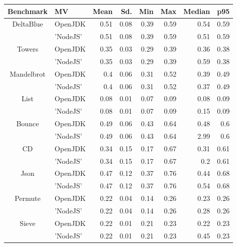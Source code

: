 \begin{center}
\begin{tabular}{ c | l r r r r r r}
\toprule
\textbf{Benchmark} & \textbf{MV} & \textbf{Mean} & \textbf{Sd.} & \textbf{Min} & \textbf{Max} & \textbf{Median} & \textbf{p95}\\
\toprule

\multirow{2}{*}{ DeltaBlue } & OpenJDK & 0.51 & 0.08 & 0.39 & 0.59 & 0.54 & 0.59 \\
& 'NodeJS' & 0.51 & 0.08 & 0.39 & 0.59 & 0.51 & 0.59 \\
\midrule

\multirow{2}{*}{ Towers } & OpenJDK & 0.35 & 0.03 & 0.29 & 0.39 & 0.36 & 0.38 \\
& 'NodeJS' & 0.35 & 0.03 & 0.29 & 0.39 & 0.59 & 0.38 \\
\midrule

\multirow{2}{*}{ Mandelbrot } & OpenJDK & 0.4 & 0.06 & 0.31 & 0.52 & 0.39 & 0.49 \\
& 'NodeJS' & 0.4 & 0.06 & 0.31 & 0.52 & 0.37 & 0.49 \\
\midrule

\multirow{2}{*}{ List } & OpenJDK & 0.08 & 0.01 & 0.07 & 0.09 & 0.08 & 0.09 \\
& 'NodeJS' & 0.08 & 0.01 & 0.07 & 0.09 & 0.15 & 0.09 \\
\midrule

\multirow{2}{*}{ Bounce } & OpenJDK & 0.49 & 0.06 & 0.43 & 0.64 & 0.48 & 0.6 \\
& 'NodeJS' & 0.49 & 0.06 & 0.43 & 0.64 & 2.99 & 0.6 \\
\midrule

\multirow{2}{*}{ CD } & OpenJDK & 0.34 & 0.15 & 0.17 & 0.67 & 0.31 & 0.61 \\
& 'NodeJS' & 0.34 & 0.15 & 0.17 & 0.67 & 0.2 & 0.61 \\
\midrule

\multirow{2}{*}{ Json } & OpenJDK & 0.47 & 0.12 & 0.37 & 0.76 & 0.44 & 0.68 \\
& 'NodeJS' & 0.47 & 0.12 & 0.37 & 0.76 & 0.54 & 0.68 \\
\midrule

\multirow{2}{*}{ Permute } & OpenJDK & 0.22 & 0.04 & 0.14 & 0.26 & 0.23 & 0.26 \\
& 'NodeJS' & 0.22 & 0.04 & 0.14 & 0.26 & 0.28 & 0.26 \\
\midrule

\multirow{2}{*}{ Sieve } & OpenJDK & 0.22 & 0.01 & 0.21 & 0.23 & 0.22 & 0.23 \\
& 'NodeJS' & 0.22 & 0.01 & 0.21 & 0.23 & 0.45 & 0.23 \\
\midrule


\end{tabular}
\end{center}
